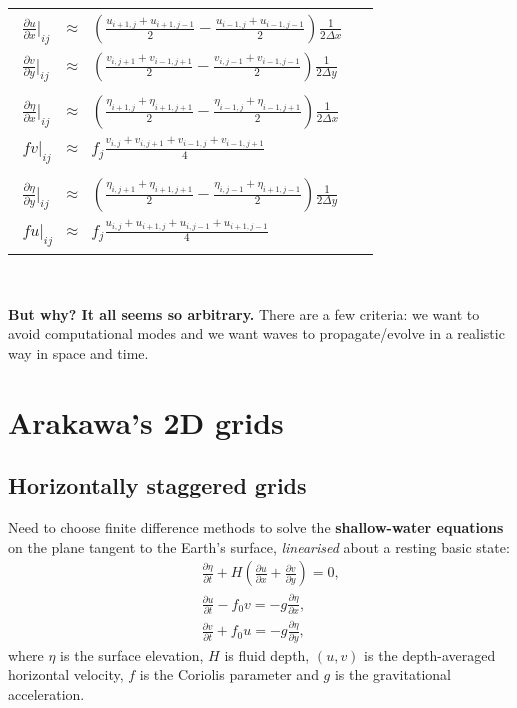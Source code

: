 \begin{tabular}{lc}
	\begin{minipage}[c]{0.7\textwidth}
		\begin{eqnarray*}
			\frac{\partial u}{\partial x}\Big|_{ij} &\approx& \left(\frac{u_{i+1,j}+u_{i+1,j-1}}{2} - \frac{u_{i-1,j}+u_{i-1,j-1}}{2} \right)\frac{1}{2 \Delta x} \\
			\frac{\partial v}{\partial y}\Big|_{ij} &\approx& \left(\frac{v_{i,j+1}+v_{i-1,j+1}}{2} - \frac{v_{i,j-1}+v_{i-1,j-1}}{2} \right)\frac{1}{2 \Delta y} \\
			&& \\
			\frac{\partial \eta}{\partial x}\Big|_{ij} &\approx& \left(\frac{\eta_{i+1,j}+\eta_{i+1,j+1}}{2} - \frac{\eta_{i-1,j}+\eta_{i-1,j+1}}{2} \right)\frac{1}{2 \Delta x} \\
			f v\big|_{ij} &\approx& f_j \frac{v_{i,j}+v_{i,j+1}+v_{i-1,j}+v_{i-1,j+1}}{4} \\
			&& \\
			\frac{\partial \eta}{\partial y}\Big|_{ij} &\approx& \left(\frac{\eta_{i,j+1}+\eta_{i+1,j+1}}{2} - \frac{\eta_{i,j-1}+\eta_{i+1,j-1}}{2} \right)\frac{1}{2 \Delta y} \\
			f u\big|_{ij} &\approx& f_j \frac{u_{i,j}+u_{i+1,j}+u_{i,j-1}+u_{i+1,j-1}}{4}
		\end{eqnarray*}
	\end{minipage}
\end{tabular}

~

{\bf But why? It all seems so arbitrary.} There are a few criteria: we want to avoid computational modes and we want waves to propagate/evolve in a realistic way in space and time.

\section{Arakawa's 2D grids}
\subsection{Horizontally staggered grids} 

Need to choose finite difference
methods to solve the {\bf shallow-water equations} on the
plane tangent to the Earth's surface, {\em linearised} about a resting basic state:
\begin{eqnarray}
	&&\frac{\partial \eta}{\partial t} + H \left(
	\frac{\partial u}{\partial x}+\frac{\partial v}{\partial y}\right) = 0,
	\\
	&&\frac{\partial u}{\partial t} - f_0 v = - g\frac{\partial \eta}{\partial x}, \\
	&&\frac{\partial v}{\partial t} + f_0 u = - g\frac{\partial \eta}{\partial y}, 
\end{eqnarray}
where $\eta$ is the surface elevation, $H$ is fluid depth, $(u,v)$ is
the depth-averaged horizontal velocity, $f$ is the Coriolis parameter
and $g$ is the gravitational acceleration. 

